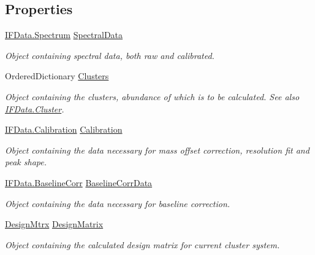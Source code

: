 \subsection*{Properties}
\begin{DoxyCompactItemize}
\item 
\hyperlink{class_isotope_fit_1_1_i_f_data_1_1_spectrum}{I\+F\+Data.\+Spectrum} \hyperlink{class_isotope_fit_1_1_workspace_a1d6cc2dd07cbfe920da9f1bffc9b32c2}{Spectral\+Data}
\begin{DoxyCompactList}\small\item\em Object containing spectral data, both raw and calibrated. \end{DoxyCompactList}\item 
Ordered\+Dictionary \hyperlink{class_isotope_fit_1_1_workspace_a13958fbe0adace21990cb1eabbd421e9}{Clusters}
\begin{DoxyCompactList}\small\item\em Object containing the clusters, abundance of which is to be calculated. See also \hyperlink{class_isotope_fit_1_1_i_f_data_1_1_cluster}{I\+F\+Data.\+Cluster}. \end{DoxyCompactList}\item 
\hyperlink{class_isotope_fit_1_1_i_f_data_1_1_calibration}{I\+F\+Data.\+Calibration} \hyperlink{class_isotope_fit_1_1_workspace_a0ed1cfd6701db24de84f4ba67eed0442}{Calibration}
\begin{DoxyCompactList}\small\item\em Object containing the data necessary for mass offset correction, resolution fit and peak shape. \end{DoxyCompactList}\item 
\hyperlink{class_isotope_fit_1_1_i_f_data_1_1_baseline_corr}{I\+F\+Data.\+Baseline\+Corr} \hyperlink{class_isotope_fit_1_1_workspace_a700395fbb329b1a0fcb5932095db066f}{Baseline\+Corr\+Data}
\begin{DoxyCompactList}\small\item\em Object containing the data necessary for baseline correction. \end{DoxyCompactList}\item 
\hyperlink{class_isotope_fit_1_1_workspace_1_1_design_mtrx}{Design\+Mtrx} \hyperlink{class_isotope_fit_1_1_workspace_ae24a2ee8f965fb2ed7ad3a592163271d}{Design\+Matrix}
\begin{DoxyCompactList}\small\item\em Object containing the calculated design matrix for current cluster system. \end{DoxyCompactList}\end{DoxyCompactItemize}


